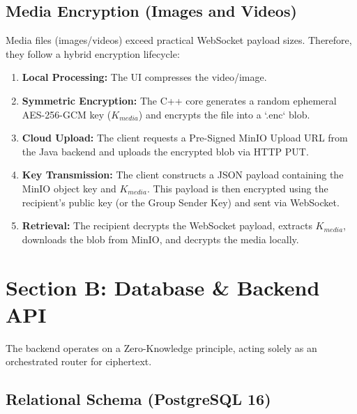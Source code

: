 \documentclass[12pt, a4paper]{article}
\begin{document}
\subsection{Media Encryption (Images and Videos)}
Media files (images/videos) exceed practical WebSocket payload sizes. Therefore, they follow a hybrid encryption lifecycle:
\begin{enumerate}
    \item \textbf{Local Processing:} The UI compresses the video/image.
    \item \textbf{Symmetric Encryption:} The C++ core generates a random ephemeral AES-256-GCM key ($K_{media}$) and encrypts the file into a `.enc` blob.
    \item \textbf{Cloud Upload:} The client requests a Pre-Signed MinIO Upload URL from the Java backend and uploads the encrypted blob via HTTP PUT.
    \item \textbf{Key Transmission:} The client constructs a JSON payload containing the MinIO object key and $K_{media}$. This payload is then encrypted using the recipient's public key (or the Group Sender Key) and sent via WebSocket.
    \item \textbf{Retrieval:} The recipient decrypts the WebSocket payload, extracts $K_{media}$, downloads the blob from MinIO, and decrypts the media locally.
\end{enumerate}


\section{Section B: Database \& Backend API}
\label{sec:backend}

The backend operates on a Zero-Knowledge principle, acting solely as an orchestrated router for ciphertext.

\subsection{Relational Schema (PostgreSQL 16)}
\end{document}
